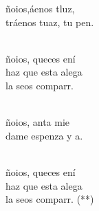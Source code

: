 \documentclass[12pt]{article}
\begin{document}
\begin{multicols*}{2}
\begin{cancion}%
	ñoios,áenos tluz,\\
	tráenos tuaz, tu pen. \\\jump\\
	\begin{chorus}%
	ñoios, queces ení\\
	haz que esta alega \\
	la seos comparr.\\
	\end{chorus}%
	\jump\\
	ñoios, anta mie\\
	dame espenza y a.\\\jump\\
	\begin{chorus}%
	ñoios, queces ení\\
	haz que esta alega \\
	la seos comparr. (**)\\
	\end{chorus}%
	\jump\\
\end{cancion}%


\end{multicols*}
\end{document}
